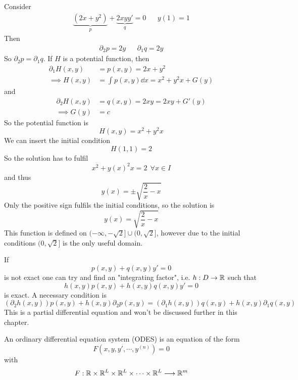 \documentclass[../../script.tex]{subfiles}
\begin{document}
\begin{eg}\label{eg:817}
    Consider 
    \begin{align*}
        \underbrace{(2x + y^2)}_p + \underbrace{2xyy'}_q = 0 && y(1) = 1
    \end{align*}
    Then 
    \begin{align*}
        \partial_2 p = 2y && \partial_1 q = 2y
    \end{align*}
    So $\partial_2 p = \partial_1 q$. If $H$ is a potential function, then 
    \begin{align*}
        \partial_1 H(x, y) &= p(x, y) = 2x + y^2 \\
        \implies H(x, y) &= \int p(x, y) \dd{x} = x^2 + y^2x + G(y)
    \end{align*}
    and 
    \begin{align*}
        \partial_2 H(x, y) &= q(x, y) = 2xy = 2xy + G'(y) \\
        \implies G(y) &= c
    \end{align*}
    So the potential function is 
    \[
        H(x, y) = x^2 + y^2 x
    \]
    We can insert the initial condition 
    \[
        H(1, 1) = 2
    \]
    So the solution has to fulfil 
    \[
        x^2 + y(x)^2 x = 2 ~~\forall x \in I
    \]
    and thus 
    \[
        y(x) = \pm \sqrt{\frac{2}{x} - x}
    \]
    Only the positive sign fulfils the initial conditions, so the solution is 
    \[
        y(x) = \sqrt{\frac{2}{x} - x}
    \]
    This function is defined on $(-\infty, -\sqrt{2}] \cup (0, \sqrt{2}]$, however due to the initial conditions $(0, \sqrt{2}]$ is the only useful domain.
\end{eg}

\begin{rem}
    If 
    \[ 
        p(x, y) + q(x, y)y' = 0
    \]
    is not exact one can try and find an "integrating factor", i.e. $h: D \rightarrow \mathbb{R}$ such that 
    \[
        h(x, y)p(x, y) + h(x, y)q(x, y)y' = 0
    \]
    is exact. A necessary condition is 
    \[
        \left(\partial_2 h(x, y)\right)p(x, y) + h(x, y) \partial_2 p(x, y) = \left(\partial_1 h(x, y)\right) q(x, y) + h(x, y) \partial_1 q(x, y)
    \]
    This is a partial differential equation and won't be discussed further in this chapter.
\end{rem}

\begin{defi}
    An ordinary differential equation system (ODES) is an equation of the form 
    \[
        F(x, y, y', \cdots, y^{(n)}) = 0
    \]
    with 
    \[
        F: \mathbb{R} \times \mathbb{R}^L \times \mathbb{R}^L \times \cdots \times \mathbb{R}^L \longrightarrow \mathbb{R}^m
    \]
\end{defi}
\end{document}
